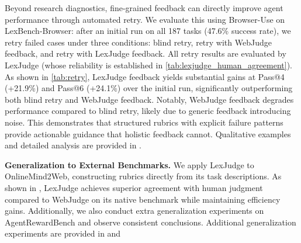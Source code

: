 Beyond research diagnostics, fine-grained feedback can directly improve agent performance through automated retry. We evaluate this using Browser-Use on LexBench-Browser: after an initial run on all 187 tasks (47.6\% success rate), we retry failed cases under three conditions: blind retry, retry with WebJudge feedback, and retry with LexJudge feedback. All retry results are evaluated by LexJudge (whose reliability is established in \cref{tab:lexjudge_human_agreement}). As shown in \cref{tab:retry}, LexJudge feedback yields substantial gains at Pass@4 (+21.9\%) and Pass@6 (+24.1\%) over the initial run, significantly outperforming both blind retry and WebJudge feedback. Notably, WebJudge feedback degrades performance compared to blind retry, likely due to generic feedback introducing noise. This demonstrates that structured rubrics with explicit failure patterns provide actionable guidance that holistic feedback cannot. Qualitative examples and detailed analysis are provided in .


\textbf{Generalization to External Benchmarks.}
We apply LexJudge to OnlineMind2Web, constructing rubrics directly from its task descriptions. As shown in , LexJudge achieves superior agreement with human judgment compared to WebJudge on its native benchmark while maintaining efficiency gains. Additionally, we also conduct extra generalization experiments on AgentRewardBench and observe consistent conclusions. Additional generalization experiments are provided in  and 